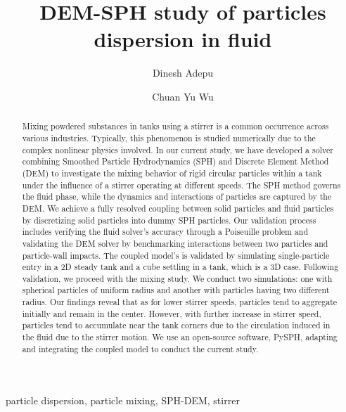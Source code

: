\documentclass[preprint,12pt]{elsarticle}
\begin{document}
\begin{frontmatter}

  \title{{DEM}-{SPH} study of particles dispersion in fluid}
  \author[xxx]{Dinesh Adepu}
  \author[xxx]{Chuan Yu Wu}
\address[xxx]{School of Chemistry and Chemical Engineering, University of Surrey}



\begin{abstract}
  Mixing powdered substances in tanks using a stirrer is a common occurrence
  across various industries. Typically, this phenomenon is studied numerically
  due to the complex nonlinear physics involved. In our current study, we have
  developed a solver combining Smoothed Particle Hydrodynamics (SPH) and
  Discrete Element Method (DEM) to investigate the mixing behavior of rigid
  circular particles within a tank under the influence of a stirrer operating
  at different speeds.  The SPH method governs the fluid phase, while the
  dynamics and interactions of particles are captured by the DEM. We achieve a
  fully resolved coupling between solid particles and fluid particles by
  discretizing solid particles into dummy SPH particles. Our validation
  process includes verifying the fluid solver's accuracy through a Poiseuille
  problem and validating the DEM solver by benchmarking interactions between
  two particles and particle-wall impacts.  The coupled model's is validated
  by simulating single-particle entry in a 2D steady tank and a cube settling
  in a tank, which is a 3D case. Following validation, we proceed with the
  mixing study. We conduct two simulations: one with spherical particles of
  uniform radius and another with particles having two different radius.  Our
  findings reveal that as for lower stirrer speeds, particles tend to
  aggregate initially and remain in the center. However, with further increase
  in stirrer speed, particles tend to accumulate near the tank corners due to
  the circulation induced in the fluid due to the stirrer motion. We use an
  open-source software, PySPH, adapting and integrating the coupled model to
  conduct the current study.
\end{abstract}

\begin{keyword}
{particle dispersion}, {particle mixing}, {SPH-DEM}, {stirrer}


\end{keyword}

\end{frontmatter}
\end{document}
